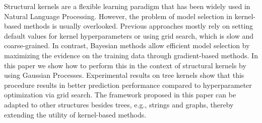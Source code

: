 Structural kernels are a flexible learning paradigm that has been widely used in Natural Language Processing. However, the problem of model selection in kernel-based methods is usually overlooked. Previous approaches mostly rely on setting default values for kernel hyperparameters or using grid search, which is slow and coarse-grained. In contrast, Bayesian methods allow efficient model selection by maximizing the evidence on the training data through gradient-based methods. In this paper we show how to perform this in the context of structural kernels by using Gaussian Processes. Experimental results on tree kernels show that this procedure results in better prediction performance compared to hyperparameter optimization via grid search. The framework proposed in this paper can be adapted to other structures besides trees, e.g., strings and graphs, thereby extending the utility of kernel-based methods.
